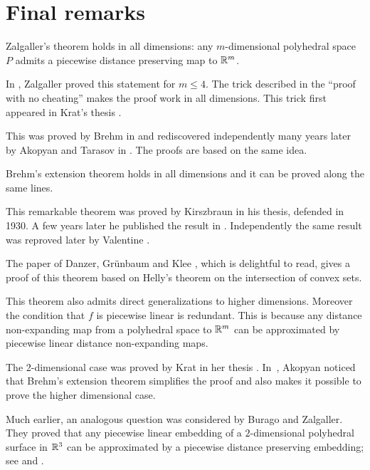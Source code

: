 \chapter*{Final remarks}\label{sec:pdp-comments}


Zalgaller's theorem holds in all dimensions: any $m$-dimensional polyhedral space $P$ admits a piecewise distance preserving map to $\mathbb{R}^m$.

In \cite{zalgaller-PL}, Zalgaller proved this statement for $m\le 4$.
The trick described in the ``proof with no cheating'' makes the proof work in all dimensions. 
This trick first appeared in Krat's thesis \cite{krat}.

This was proved  by Brehm in \cite{brehm}
and rediscovered independently many years later by Akopyan and Tarasov in \cite{akopyan-tarasov}.
The proofs are based on the same idea. 


Brehm's extension theorem holds in all dimensions
and it can be proved along the same lines.

This remarkable theorem was proved by Kirszbraun in his thesis, defended in 1930. 
A few years later he published the result in \cite{kirszbraun}.
Independently the same result was reproved later by  Valentine \cite{valentine}.

The paper of Danzer, Gr\"unbaum and Klee \cite{DGK}, which is delightful to read, gives a proof of this theorem  based on Helly's theorem on the intersection of convex sets.

This theorem 
also admits direct generalizations to higher dimensions.
Moreover the condition that $f$ is piecewise linear is redundant.
This is because
any distance non-expanding map from a polyhedral space to $\mathbb{R}^m$ can be approximated by piecewise linear distance non-expanding maps.


The 2-dimensional case was proved by Krat 
in her thesis \cite{krat}.
In~\cite{akopyan},
Akopyan noticed that Brehm's extension theorem simplifies the proof and also makes it possible 
to prove the higher dimensional case.

Much earlier, an analogous question was considered by Burago and Zalgaller.
They proved that any piecewise linear embedding 
of a $2$-dimensional polyhedral surface in $\mathbb{R}^3$ 
can be approximated by a piecewise distance preserving embedding; see \cite{burago-zalgaller-0} and \cite{burago-zalgaller}. 


